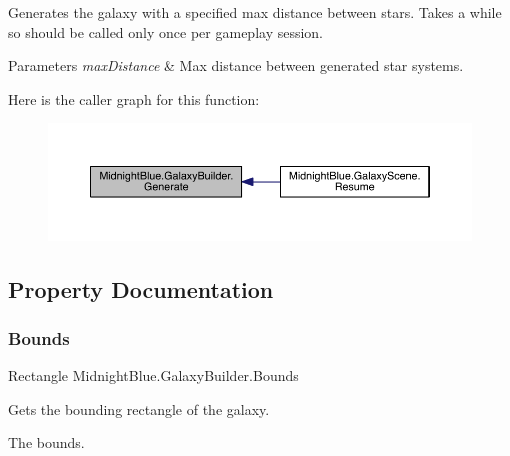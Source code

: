 Generates the galaxy with a specified max distance between stars. Takes a while so should be called only once per gameplay session. 


\begin{DoxyParams}{Parameters}
{\em max\+Distance} & Max distance between generated star systems.\\
\hline
\end{DoxyParams}
Here is the caller graph for this function\+:
\nopagebreak
\begin{figure}[H]
\begin{center}
\leavevmode
\includegraphics[width=350pt]{class_midnight_blue_1_1_galaxy_builder_aaa080e0108cf02709137b7eebb56ad1a_icgraph}
\end{center}
\end{figure}


\subsection{Property Documentation}
\hypertarget{class_midnight_blue_1_1_galaxy_builder_a9051fa0f379b34dae5a6dcd287da7d9d}{}\label{class_midnight_blue_1_1_galaxy_builder_a9051fa0f379b34dae5a6dcd287da7d9d} 
\subsubsection{\texorpdfstring{Bounds}{Bounds}}
{\footnotesize\ttfamily Rectangle Midnight\+Blue.\+Galaxy\+Builder.\+Bounds\hspace{0.3cm}{\ttfamily [get]}}



Gets the bounding rectangle of the galaxy. 

The bounds.\hypertarget{class_midnight_blue_1_1_galaxy_builder_a4b496c6930a56d2469c21acb54ff23ec}{}\label{class_midnight_blue_1_1_galaxy_builder_a4b496c6930a56d2469c21acb54ff23ec} 
